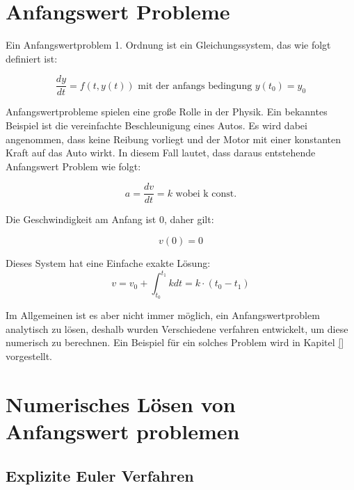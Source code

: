 
\section{Anfangswert Probleme} \label{sec:anfangswert_probleme}




Ein Anfangswertproblem 1. Ordnung ist ein Gleichungssystem, das wie folgt definiert ist:

$$
\frac{dy}{dt} = f(t, y(t)) \text{ mit der anfangs bedingung } y(t_0) = y_0
$$

Anfangswertprobleme spielen eine große Rolle in der Physik.
Ein bekanntes Beispiel ist die vereinfachte Beschleunigung eines Autos.
Es wird dabei angenommen, dass keine Reibung vorliegt und der Motor mit einer konstanten Kraft auf das Auto wirkt.
In diesem Fall lautet, dass daraus entstehende Anfangswert Problem wie folgt:

$$
a = \frac{dv}{dt} = k \text{ wobei k const.}
$$

Die Geschwindigkeit am Anfang ist 0, daher gilt:

$$
v(0) = 0
$$

Dieses System hat eine Einfache exakte Lösung:
$$
v = v_0 + \int_{t_0}^{t_1} k dt = k \cdot (t_0 - t_1) 
$$

Im Allgemeinen ist es aber nicht immer möglich, ein Anfangswertproblem analytisch zu lösen, deshalb wurden Verschiedene verfahren entwickelt, um diese numerisch zu berechnen.
Ein Beispiel für ein solches Problem wird in Kapitel \ref{} vorgestellt.

\section{Numerisches Lösen von Anfangswert problemen} \label{sec:numerisches_lösen_von_anfangswert_problemen}

\subsection{Explizite Euler Verfahren} \label{sec:explizites_euler_verfahren}

